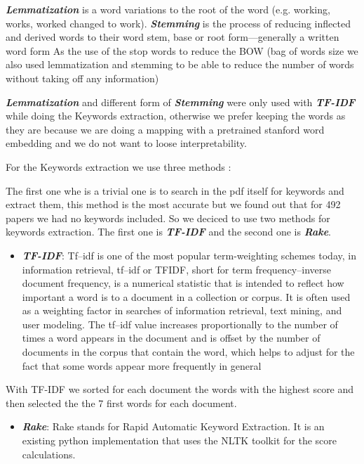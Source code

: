 \documentclass[journal,twocolumn]{IEEEtran}
\providecommand{\tightlist}{%
      \setlength{\itemsep}{0pt}\setlength{\parskip}{0pt}}
\begin{document}
\textbf{\emph{Lemmatization}} is a word variations to the root of the
word (e.g. working, works, worked changed to work).
\textbf{\emph{Stemming}} is the process of reducing inflected and
derived words to their word stem, base or root form---generally a
written word form As the use of the stop words to reduce the BOW (bag of
words size we also used lemmatization and stemming to be able to reduce
the number of words without taking off any information)

    \textbf{\emph{Lemmatization}} and different form of
\textbf{\emph{Stemming}} were only used with \textbf{\emph{TF-IDF}}
while doing the Keywords extraction, otherwise we prefer keeping the
words as they are because we are doing a mapping with a pretrained
stanford word embedding and we do not want to loose interpretability.

    For the Keywords extraction we use three methods :

The first one whe is a trivial one is to search in the pdf itself for
keywords and extract them, this method is the most accurate but we found
out that for 492 papers we had no keywords included. So we deciced to
use two methods for keywords extraction. The first one is
\textbf{\emph{TF-IDF}} and the second one is \textbf{\emph{Rake}}.

    \begin{itemize}
\tightlist
\item
  \textbf{\emph{TF-IDF}}: Tf--idf is one of the most popular
  term-weighting schemes today, in information retrieval, tf--idf or
  TFIDF, short for term frequency--inverse document frequency, is a
  numerical statistic that is intended to reflect how important a word
  is to a document in a collection or corpus. It is often used as a
  weighting factor in searches of information retrieval, text mining,
  and user modeling. The tf--idf value increases proportionally to the
  number of times a word appears in the document and is offset by the
  number of documents in the corpus that contain the word, which helps
  to adjust for the fact that some words appear more frequently in
  general \cite{Tf-idf}
\end{itemize}

    With TF-IDF we sorted for each document the words with the highest score
and then selected the the 7 first words for each document.

    \begin{itemize}
\tightlist
\item
  \textbf{\emph{Rake}}: Rake stands for Rapid Automatic Keyword
  Extraction. It is an existing python implementation that uses the NLTK
  toolkit for the score calculations.
\end{itemize}
\end{document}
